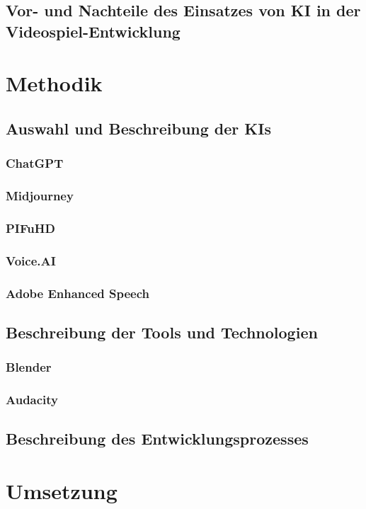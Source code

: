 \documentclass[12pt,a4paper,bibliography=totocnumbered,listof=totocnumbered]{scrartcl}
\begin{document}
\subsection{Vor- und Nachteile des Einsatzes von KI in der Videospiel-Entwicklung}

\section{Methodik}
\subsection{Auswahl und Beschreibung der KIs}
\subsubsection{ChatGPT}
\subsubsection{Midjourney}
\subsubsection{PIFuHD}
\subsubsection{Voice.AI}
\subsubsection{Adobe Enhanced Speech}

\subsection{Beschreibung der Tools und Technologien}
\subsubsection{Blender}
\subsubsection{Audacity}

\subsection{Beschreibung des Entwicklungsprozesses}


\section{Umsetzung}
\end{document}
